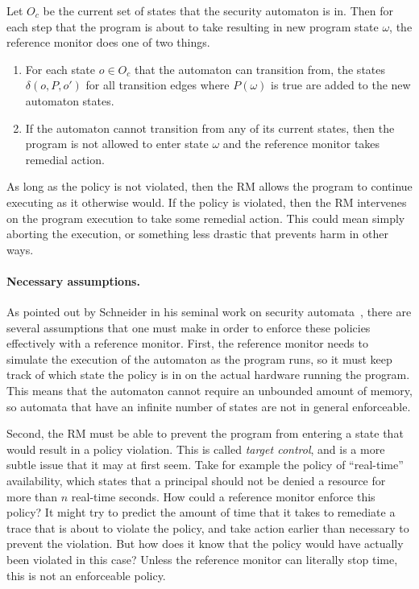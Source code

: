 \documentclass[11pt,twoside]{scrartcl}
\begin{document}
\begin{definition}
\label{def:sae}
Let $O_c$ be the current set of states that the security automaton is in. Then for each step that the program is about to take resulting in new program state $\omega$, the reference monitor does one of two things.
\begin{enumerate}
\item For each state $o \in O_c$ that the automaton can transition from, the states $\delta(o,P,o')$ for all transition edges where $P(\omega)$ is true are added to the new automaton states.
\item If the automaton cannot transition from any of its current states, then the program is not allowed to enter state $\omega$ and the reference monitor takes remedial action.
\end{enumerate}
\end{definition}

As long as the policy is not violated, then the RM allows the program to continue executing as it otherwise would. If the policy is violated, then the RM intervenes on the program execution to take some remedial action. This could mean simply aborting the execution, or something less drastic that prevents harm in other ways.

\paragraph{Necessary assumptions.} As pointed out by Schneider in his seminal work on security automata~\cite{Schneider2000}, there are several assumptions that one must make in order to enforce these policies effectively with a reference monitor. First, the reference monitor needs to simulate the execution of the automaton as the program runs, so it must keep track of which state the policy is in on the actual hardware running the program. This means that the automaton cannot require an unbounded amount of memory, so automata that have an infinite number of states are not in general enforceable.

Second, the RM must be able to prevent the program from entering a state that would result in a policy violation. This is called \emph{target control}, and is a more subtle issue that it may at first seem. Take for example the policy of ``real-time'' availability, which states that a principal should not be denied a resource for more than $n$ real-time seconds. How could a reference monitor enforce this policy? It might try to predict the amount of time that it takes to remediate a trace that is about to violate the policy, and take action earlier than necessary to prevent the violation. But how does it know that the policy would have actually been violated in this case? Unless the reference monitor can literally stop time, this is not an enforceable policy.
\end{document}
